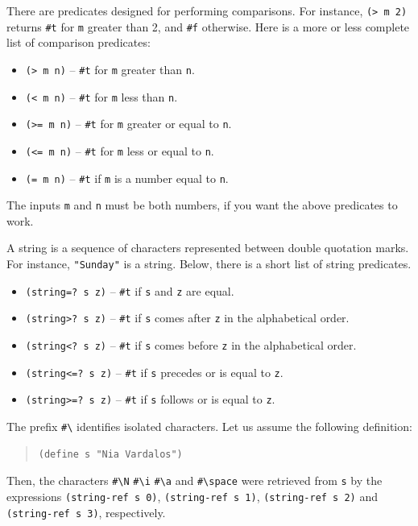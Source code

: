 \documentclass[a4paper,12pt]{book}
\begin{document}
There are predicates designed for
performing comparisons. For instance,
\verb|(> m 2)| returns \verb|#t| for
\verb|m| greater than 2, and \verb|#f|
otherwise. Here is a more or less complete
list of comparison predicates:
\begin{itemize}
\item\verb|(> m n)| -- \verb|#t| for
  \verb|m| greater than \verb|n|.
\item\verb|(< m n)| -- \verb|#t| for
  \verb|m| less than \verb|n|.
\item\verb|(>= m n)| -- \verb|#t| for
  \verb|m| greater or equal to \verb|n|.
\item\verb|(<= m n)| -- \verb|#t| for
  \verb|m| less or equal to \verb|n|.
\item\verb|(= m n)| -- \verb|#t| if
  \verb|m| is a number equal to \verb|n|.
\end{itemize}
The inputs \verb|m| and \verb|n| must
be both numbers, if you want
the above predicates to work.


A string is a sequence of characters
represented between double quotation
marks. For instance, \verb|"Sunday"|
is a string. Below, there is a short
list of string predicates.
\begin{itemize}
\item\verb|(string=? s z)| -- \verb|#t|
  if \verb|s| and \verb|z| are equal.
\item\verb|(string>? s z)| -- \verb|#t|
  if \verb|s|  comes
  after \verb|z| in the alphabetical order.
\item\verb|(string<? s z)| -- \verb|#t|
  if \verb|s| comes before \verb|z|
  in the alphabetical order.
\item\verb|(string<=? s z)| -- \verb|#t| if
  \verb|s| precedes or is equal to \verb|z|.
\item\verb|(string>=? s z)| -- \verb|#t| if
  \verb|s| follows or is equal to \verb|z|.
\end{itemize}

The prefix \verb|#\| identifies isolated
characters. Let us assume the following
definition:
\begin{quote}
\begin{verbatim}
(define s "Nia Vardalos")
\end{verbatim}
\end{quote}
Then, the characters
\verb|#\N| \verb|#\i| 
\verb|#\a| and \verb|#\space|
were retrieved from
\verb|s| by the
expressions \verb|(string-ref s 0)|,
\verb|(string-ref s 1)|,
\verb|(string-ref s 2)| and
 \verb|(string-ref s 3)|,
\verb|| respectively.
\end{document}
